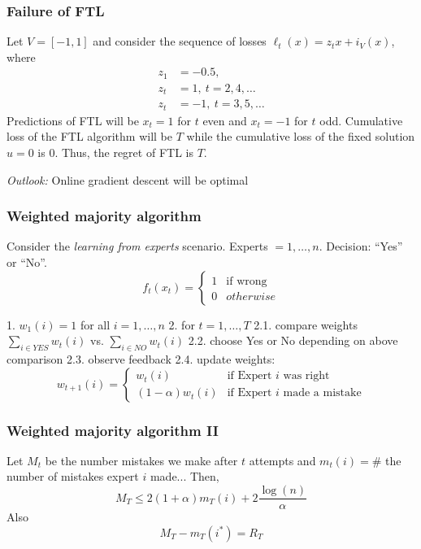 \documentclass{beamer}
\begin{document}
\begin{frame}
  \frametitle{Failure of FTL}
    Let $V = [-1,1]$ and consider the sequence of losses $\ell_t(x) = z_t x + i_V(x)$, where
    \begin{align*}
      z_1 &= -0.5,\\
      z_{t} &= 1, \ t=2, 4, \dots\\
      z_{t} &= -1, \ t=3, 5, \dots
    \end{align*}
    Predictions of FTL will be $x_t = 1$ for $t$ even and $x_t = -1$ for $t$ odd.
    Cumulative loss of the FTL algorithm will be $T$ while the cumulative loss of the fixed solution $u = 0$ is 0. Thus, the regret of FTL is $T$.

    \emph{Outlook:} Online gradient descent will be optimal
\end{frame}

\begin{frame}
  \frametitle{Weighted majority algorithm}
  Consider the \emph{learning from experts} scenario.
  Experts $= 1, \dots, n$. Decision: ``Yes'' or ``No''.
  \begin{equation}
    f_t(x_t) = \begin{cases}
      1 & \text{if wrong}\\
      0 & otherwise
    \end{cases}
  \end{equation}

  1. $w_1(i) = 1$ for all $i = 1, \dots, n$
  2. for $t=1, \dots, T$
      2.1. compare weights $\sum_{i\in YES} w_t(i)$ vs. $\sum_{i\in NO} w_t(i)$
      2.2. choose Yes or No depending on above comparison
      2.3. observe feedback
      2.4. update weights:
      \begin{equation}
        w_{t+1}(i) = \begin{cases}
            w_t(i) & \text{if Expert $i$ was right} \\
            (1-\alpha)w_t(i) & \text{if Expert $i$ made a mistake}
        \end{cases}

      \end{equation}

\end{frame}

\begin{frame}
  \frametitle{Weighted majority algorithm II}
  \begin{theorem}
    \label{thm:}
    Let $M_t$ be the number mistakes we make after $t$ attempts and
    $m_t(i) = \#$ the number of mistakes expert $i$ made...
    Then,
    \begin{equation}
      M_T \le 2(1+\alpha) m_T(i) + 2 \frac{\log(n)}{\alpha}
    \end{equation}
    Also
    \begin{equation}
      M_T -m_T(i^*) = R_T
    \end{equation}

  \end{theorem}
\end{frame}
\end{document}
